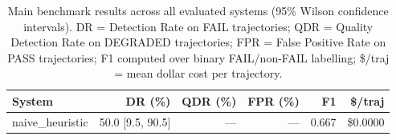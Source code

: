 \begin{table}[t]
\centering
\caption{Main benchmark results across all evaluated systems (95\% Wilson confidence intervals).
DR = Detection Rate on FAIL trajectories; QDR = Quality Detection Rate on DEGRADED trajectories;
FPR = False Positive Rate on PASS trajectories; F1 computed over binary FAIL/non-FAIL labelling;
\$/traj = mean dollar cost per trajectory.}
\label{tab:main_results}
\small
\begin{tabular}{lrrrrr}
\toprule
\textbf{System} & \textbf{DR (\%)} & \textbf{QDR (\%)} & \textbf{FPR (\%)} & \textbf{F1} & \textbf{\$/traj} \\
\midrule
naive\_heuristic & 50.0 {\small [9.5, 90.5]} & --- & --- & 0.667 & \$0.0000 \\
\bottomrule
\end{tabular}
\end{table}
